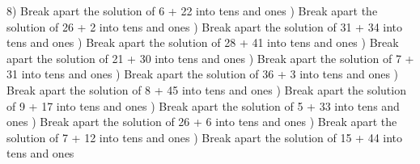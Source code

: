 \documentclass{article}%
\begin{document}
8) Break apart the solution of 6 + 22 into tens and ones%
\newline%
\newline%
) Break apart the solution of 26 + 2 into tens and ones%
\newline%
\newline%
) Break apart the solution of 31 + 34 into tens and ones%
\newline%
\newline%
) Break apart the solution of 28 + 41 into tens and ones%
\newline%
\newline%
) Break apart the solution of 21 + 30 into tens and ones%
\newline%
\newline%
) Break apart the solution of 7 + 31 into tens and ones%
\newline%
\newline%
) Break apart the solution of 36 + 3 into tens and ones%
\newline%
\newline%
) Break apart the solution of 8 + 45 into tens and ones%
\newline%
\newline%
) Break apart the solution of 9 + 17 into tens and ones%
\newline%
\newline%
) Break apart the solution of 5 + 33 into tens and ones%
\newline%
\newline%
) Break apart the solution of 26 + 6 into tens and ones%
\newline%
\newline%
) Break apart the solution of 7 + 12 into tens and ones%
\newline%
\newline%
) Break apart the solution of 15 + 44 into tens and ones%
\newline%
\end{document}
